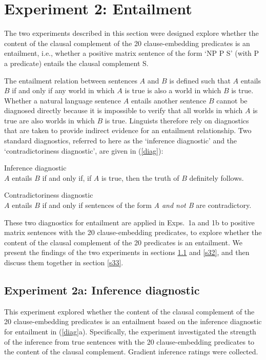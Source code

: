\documentclass[11pt,fleqn]{article}
\newcommand{\6}{\mbox{$[\hspace*{-.6mm}[$}}
\newcommand{\9}{\mbox{$]\hspace*{-.6mm}]$}}
\begin{document}
\section{Experiment 2: Entailment}\label{s3}

The two experiments described in this section were designed explore whether the content of the clausal complement of the 20 clause-embedding predicates is an entailment, i.e., whether a positive matrix sentence of the form `NP P S' (with P a predicate) entails the clausal complement S. 

The entailment relation between sentences $A$ and $B$ is defined such that $A$ entails $B$ if and only if any world in which $A$ is true is also a world in which $B$ is true. Whether a natural language sentence $A$ entails another sentence $B$ cannot be diagnosed directly because it is impossible to verify that all worlds in which $A$ is true are also worlds in which $B$ is true. Linguists therefore rely on diagnostics that are taken to provide indirect evidence for an entailment relationship. Two standard diagnostics, referred to here as the `inference diagnostic' and the `contradictoriness diagnostic', are given in (\ref{diag}): 

\begin{exe}
\ex\label{diag} \citealt[\S3.1]{ccmg90}
\begin{xlist}
\ex  Inference diagnostic \\ $A$ entails $B$ if and only if, if $A$ is true, then the truth of $B$ definitely follows. 

\ex  Contradictoriness diagnostic \\ $A$ entails $B$ if and only if sentences of the form {\em A and not B} are contradictory. 

\end{xlist}
\end{exe}
These two diagnostics for entailment are applied in Exps.~1a and 1b to positive matrix sentences with the 20 clause-embedding predicates, to explore whether the content of the clausal complement of the 20 predicates is an entailment. We present the findings of the two experiments in sections \ref{s31} and \ref{s32}, and then discuss them together in section \ref{s33}.

\subsection{Experiment 2a: Inference diagnostic}\label{s31}

This experiment explored whether the content of the clausal complement of the 20 clause-embedding predicates is an entailment based on the inference diagnostic for entailment in (\ref{diag}a). Specifically, the experiment investigated the strength of the inference from true sentences with the 20 clause-embedding predicates to the content of the clausal complement. Gradient inference ratings were collected.
\end{document}
